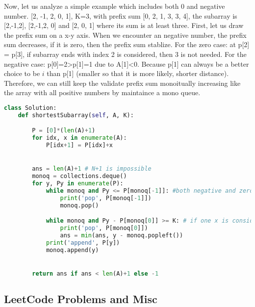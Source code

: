 \documentclass[../main.tex]{subfiles}
\begin{document}
\begin{examples}[resume]
Now, let us analyze a simple example which includes both 0 and negative number. [2, -1, 2, 0, 1], K=3, with prefix sum [0, 2, 1, 3, 3, 4], the subarray is [2,-1,2], [2,-1,2, 0] and [2, 0, 1] where its sum is at least three. First, let us draw the prefix sum on a x-y axis. When we encounter an negative number, the prefix sum decreases, if it is zero, then the prefix sum stablize. For the zero case: at p[2] = p[3], if subarray ends with index 2 is considered, then 3 is not needed. For the negative case: p[0]=2>p[1]=1 due to A[1]<0. Because p[1] can always be a better choice to be $i$ than p[1] (smaller so that it is more likely, shorter distance). Therefore, we can still keep the validate prefix sum monoitually increasing like the array with all positive numbers by maintaince a mono queue. 
\begin{lstlisting}[language = Python]
class Solution:
    def shortestSubarray(self, A, K):

        P = [0]*(len(A)+1)
        for idx, x in enumerate(A):
            P[idx+1] = P[idx]+x


        ans = len(A)+1 # N+1 is impossible
        monoq = collections.deque() 
        for y, Py in enumerate(P):
            while monoq and Py <= P[monoq[-1]]: #both negative and zero leads to kick out any prevous larger or equal value
                print('pop', P[monoq[-1]])
                monoq.pop()

            while monoq and Py - P[monoq[0]] >= K: # if one x is considered, no need to consider again (similar to sliding window where we move the first index forward)
                print('pop', P[monoq[0]])
                ans = min(ans, y - monoq.popleft())
            print('append', P[y])
            monoq.append(y)


        return ans if ans < len(A)+1 else -1
\end{lstlisting}
\end{examples}

\subsection{LeetCode Problems and Misc}
\end{document}
